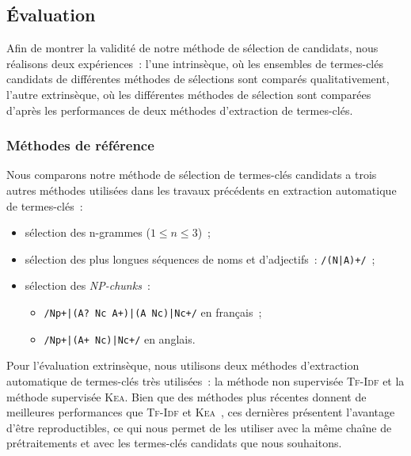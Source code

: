     \subsection{Évaluation}
    \label{subsec:main:domain_independent_keyphrase_extraction-keyphrase_candidate_selection-evaluation}
      Afin de montrer la validité de notre méthode de sélection de candidats,
      nous réalisons deux expériences~: l'une intrinsèque, où les ensembles de
      termes-clés candidats de différentes méthodes de sélections sont comparés
      qualitativement, l'autre extrinsèque, où les différentes méthodes de
      sélection sont comparées d'après les performances de deux méthodes
      d'extraction de termes-clés.

      \subsubsection{Méthodes de référence}
      \label{subsubsec:main:domain_independent_keyphrase_extraction-keyphrase_candidate_selection-evaluation-baselines}
        Nous comparons notre méthode de sélection de termes-clés candidats a
        trois autres méthodes utilisées dans les travaux précédents en
        extraction automatique de termes-clés~:
        \begin{itemize}
          \item{sélection des n-grammes ($1 \leq n \leq 3$)~;}
          \item{sélection des plus longues séquences de noms et d'adjectifs~:
                \texttt{/(N|A)+/}~;}
          \item{sélection des \textit{NP-chunks}~:}
          \begin{itemize}
            \item{\texttt{/Np+|(A? Nc A+)|(A Nc)|Nc+/} en français~;}
            \item{\texttt{/Np+|(A+ Nc)|Nc+/} en anglais.}
          \end{itemize}
        \end{itemize}

        Pour l'évaluation extrinsèque, nous utilisons deux méthodes d'extraction
        automatique de termes-clés très utilisées~: la méthode non supervisée
        \textsc{Tf-Idf} et la méthode supervisée \textsc{Kea}. Bien que des
        méthodes plus récentes donnent de meilleures performances que
        \textsc{Tf-Idf} et \textsc{Kea}~\cite{kim2010semeval}, ces dernières
        présentent l'avantage d'être reproductibles, ce qui nous permet de les
        utiliser avec la même chaîne de prétraitements et avec les termes-clés
        candidats que nous souhaitons.

